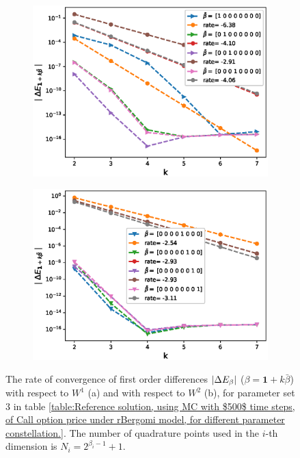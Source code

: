 \begin{figure}[h!]
	\centering
	\begin{subfigure}{.3\textwidth}
		\centering
		\includegraphics[width=1\linewidth]{./figures/rBergomi_mixed_error_rates/without_change_measure/N_4/H_002/first_difference_rbergomi_4steps_H_002_K_1_totally_hierarch_with_rate_W1}
		\caption{}
		\label{fig:sub3}
	\end{subfigure}%
	\begin{subfigure}{.3\textwidth}
		\centering
		\includegraphics[width=1\linewidth]{./figures/rBergomi_mixed_error_rates/without_change_measure/N_4/H_002/first_difference_rbergomi_4steps_H_002_K_1_totally_hierarch_with_rate_W2}
		\caption{}
		\label{fig:sub4}
	\end{subfigure}
	
	
	
	\caption{The rate of convergence of  first order differences $\left\lvert\Delta E_{\beta}\right\rvert$ ($\beta=\mathbf{1}+k \bar{\beta}$) with respect to $W^1$ (a)  and  with respect to $W^2$ (b), for parameter set $3$ in table \ref{table:Reference solution, using MC with $500$ time steps, of Call option price under rBergomi model, for different parameter constellation.}. The number of quadrature points used in the $i$-th dimension is $N_i=2^{\beta_i-1}+1$. }
	\label{fig:first_diff_comp_K_1_H_002}
\end{figure}


